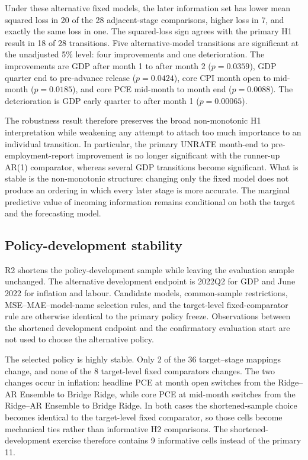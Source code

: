 Under these alternative fixed models, the later information set has lower
mean squared loss in 20 of the 28 adjacent-stage comparisons, higher loss in
7, and exactly the same loss in one. The squared-loss sign agrees with the
primary H1 result in 18 of 28 transitions. Five alternative-model transitions
are significant at the unadjusted 5\% level: four improvements and one
deterioration. The improvements are GDP after month 1 to after month 2
(\(p=0.0359\)), GDP quarter end to pre-advance release (\(p=0.0424\)),
core CPI month open to mid-month (\(p=0.0185\)), and core PCE mid-month to
month end (\(p=0.0088\)). The deterioration is GDP early quarter to after
month 1 (\(p=0.00065\)).

The robustness result therefore preserves the broad non-monotonic H1
interpretation while weakening any attempt to attach too much importance to an
individual transition. In particular, the primary UNRATE month-end to
pre-employment-report improvement is no longer significant with the runner-up
AR(1) comparator, whereas several GDP transitions become significant. What
is stable is the non-monotonic structure: changing only the fixed model does
not produce an ordering in which every later stage is more accurate. The
marginal predictive value of incoming information remains conditional on both
the target and the forecasting model.

\subsection{Policy-development stability}
\label{subsec:policy_development_stability}

R2 shortens the policy-development sample while leaving the evaluation sample
unchanged. The alternative development endpoint is 2022Q2 for GDP and June
2022 for inflation and labour. Candidate models, common-sample restrictions,
MSE--MAE--model-name selection rules, and the target-level fixed-comparator
rule are otherwise identical to the primary policy freeze. Observations
between the shortened development endpoint and the confirmatory evaluation
start are not used to choose the alternative policy.

The selected policy is highly stable. Only 2 of the 36 target--stage mappings
change, and none of the 8 target-level fixed comparators changes. The two
changes occur in inflation: headline PCE at month open switches from the
Ridge--AR Ensemble to Bridge Ridge, while core PCE at mid-month switches from
the Ridge--AR Ensemble to Bridge Ridge. In both cases the shortened-sample
choice becomes identical to the target-level fixed comparator, so those cells
become mechanical ties rather than informative H2 comparisons. The
shortened-development exercise therefore contains 9 informative cells instead
of the primary 11.

